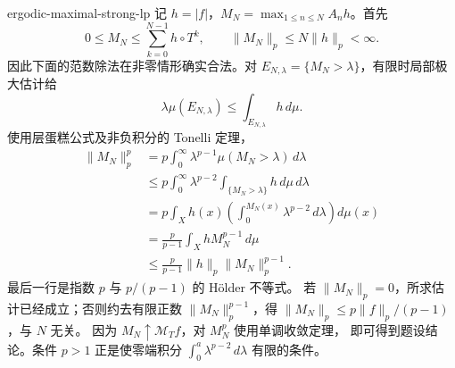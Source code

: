 \begin{solution}{ergodic-maximal-strong-lp}
记 $h=|f|$，$M_N=\max_{1\le n\le N}A_nh$。首先
\[
 0\le M_N\le\sum_{k=0}^{N-1}h\circ T^k,
 \qquad\|M_N\|_p\le N\|h\|_p<\infty.
\]
因此下面的范数除法在非零情形确实合法。对
$E_{N,\lambda}=\{M_N>\lambda\}$，有限时局部极大估计给
\[
 \lambda\mu(E_{N,\lambda})\le\int_{E_{N,\lambda}}h\,d\mu.
\]
使用层蛋糕公式及非负积分的 Tonelli 定理，
\begin{align*}
 \|M_N\|_p^p
 &=p\int_0^\infty\lambda^{p-1}\mu(M_N>\lambda)\,d\lambda\\
 &\le p\int_0^\infty\lambda^{p-2}
               \int_{\{M_N>\lambda\}}h\,d\mu\,d\lambda\\
 &=p\int_Xh(x)\left(\int_0^{M_N(x)}\lambda^{p-2}\,d\lambda\right)d\mu(x)\\
 &=\frac p{p-1}\int_XhM_N^{p-1}\,d\mu\\
 &\le\frac p{p-1}\|h\|_p\|M_N\|_p^{p-1}.
\end{align*}
最后一行是指数 $p$ 与 $p/(p-1)$ 的 Hölder 不等式。
若 $\|M_N\|_p=0$，所求估计已经成立；否则约去有限正数
$\|M_N\|_p^{p-1}$，得
$\|M_N\|_p\le p\|f\|_p/(p-1)$，与 $N$ 无关。
因为 $M_N\uparrow\mathcal M_Tf$，对 $M_N^p$ 使用单调收敛定理，
即可得到题设结论。条件 $p>1$ 正是使零端积分
$\int_0^a\lambda^{p-2}\,d\lambda$ 有限的条件。
\end{solution}
